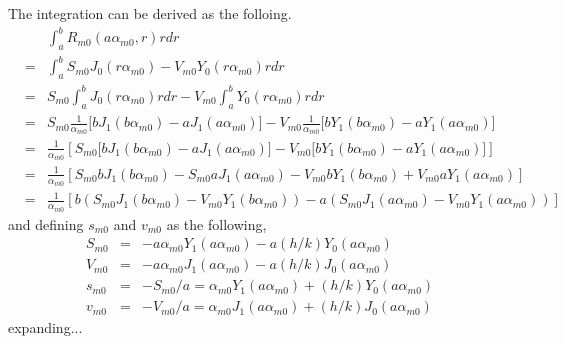 \documentclass{article}
\begin{document}
%
The integration can be derived as the folloing.
%
\begin{eqnarray}
    & & \int_a^b R_{m0}(a\alpha_{m0}, r) rdr
\nonumber\\
    &=& \int_a^b S_{m0}J_0(r\alpha_{m0}) - V_{m0}Y_0(r\alpha_{m0}) rdr
\nonumber\\
    &=& S_{m0}\int_a^b J_0(r\alpha_{m0})rdr - V_{m0}\int_a^b Y_0(r\alpha_{m0}) rdr
\nonumber\\
    &=& S_{m0}\frac{1}{\alpha_{m0}}\Big[bJ_1(b\alpha_{m0}) - aJ_1(a\alpha_{m0})\Big] -
        V_{m0}\frac{1}{\alpha_{m0}}\Big[bY_1(b\alpha_{m0}) - aY_1(a\alpha_{m0})\Big]
\nonumber\\
    &=& \frac{1}{\alpha_{m0}}\left[
        S_{m0}\Big[bJ_1(b\alpha_{m0}) - aJ_1(a\alpha_{m0})\Big] -
        V_{m0}\Big[bY_1(b\alpha_{m0}) - aY_1(a\alpha_{m0})\Big]\right]
\nonumber\\
    &=& \frac{1}{\alpha_{m0}}\left[
        S_{m0}bJ_1(b\alpha_{m0}) - S_{m0}aJ_1(a\alpha_{m0}) -
        V_{m0}bY_1(b\alpha_{m0}) + V_{m0}aY_1(a\alpha_{m0})\right]
\nonumber\\
    &=& \frac{1}{\alpha_{m0}}\left[
        b(S_{m0}J_1(b\alpha_{m0}) - V_{m0}Y_1(b\alpha_{m0})) -
        a(S_{m0}J_1(a\alpha_{m0}) - V_{m0}Y_1(a\alpha_{m0}))
        \right]
\end{eqnarray}
%
and defining $s_{m0}$ and $v_{m0}$ as the following,
%
\begin{eqnarray}
    S_{m0} &=& -a\alpha_{m0}Y_1(a\alpha_{m0}) - a(h/k)Y_0(a\alpha_{m0}) \nonumber\\
    V_{m0} &=& -a\alpha_{m0}J_1(a\alpha_{m0}) - a(h/k)J_0(a\alpha_{m0}) \nonumber\\
    s_{m0} &=& -S_{m0}/a = \alpha_{m0}Y_1(a\alpha_{m0}) + (h/k)Y_0(a\alpha_{m0}) \nonumber\\
    v_{m0} &=& -V_{m0}/a = \alpha_{m0}J_1(a\alpha_{m0}) + (h/k)J_0(a\alpha_{m0}) \nonumber
\end{eqnarray}
%
expanding...
%
\end{document}
